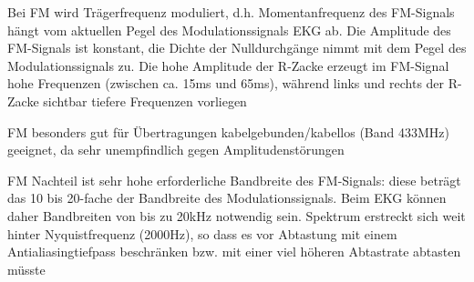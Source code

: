 \documentclass[a4paper]{article}
\begin{document}
\begin{multicols}{3}
\begin{itemize*}
    \item Bei FM wird Trägerfrequenz moduliert, d.h. Momentanfrequenz des FM-Signals hängt vom aktuellen Pegel des Modulationssignals EKG ab. Die Amplitude des FM-Signals ist konstant, die Dichte der Nulldurchgänge nimmt mit dem Pegel des Modulationssignals zu. Die hohe Amplitude der R-Zacke erzeugt im FM-Signal hohe Frequenzen (zwischen ca. 15ms und 65ms), während links und rechts der R-Zacke sichtbar tiefere Frequenzen vorliegen
    \item FM besonders gut für Übertragungen kabelgebunden/kabellos (Band 433MHz) geeignet, da sehr unempfindlich gegen Amplitudenstörungen
    \item FM Nachteil ist sehr hohe erforderliche Bandbreite des FM-Signals: diese beträgt das 10 bis 20-fache der Bandbreite des Modulationssignals. Beim EKG können daher Bandbreiten von bis zu 20kHz notwendig sein. Spektrum erstreckt sich weit hinter Nyquistfrequenz (2000Hz), so dass es vor Abtastung mit einem Antialiasingtiefpass beschränken bzw. mit einer viel höheren Abtastrate abtasten müsste
  \end{itemize*}


\end{multicols}
\end{document}
